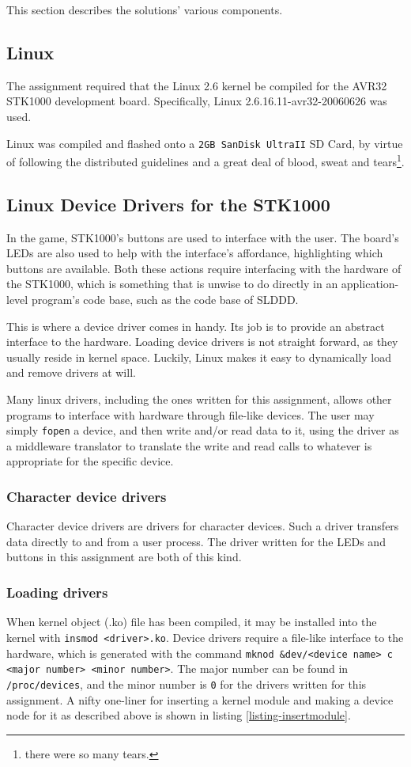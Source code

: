 This section describes the solutions' various components.

\subsection{Linux}
The assignment required that the Linux 2.6 kernel be compiled for the AVR32 STK1000 development board.
Specifically, Linux 2.6.16.11-avr32-20060626 was used.

Linux was compiled and flashed onto a \texttt{2GB SanDisk UltraII} SD Card, by virtue of following the distributed guidelines and a great deal of blood, sweat and tears\footnote{there were so many tears.}.

\subsection{Linux Device Drivers for the STK1000}
In the game, STK1000's buttons are used to interface with the user.
The board's LEDs are also used to help with the interface's affordance, highlighting which buttons are available.
Both these actions require interfacing with the hardware of the STK1000, which is something that is unwise to do directly in an application-level program's code base, such as the code base of SLDDD.

This is where a device driver comes in handy. Its job is to provide an abstract interface to the hardware.
Loading device drivers is not straight forward, as they usually reside in kernel space.
Luckily, Linux makes it easy to dynamically load and remove drivers at will.

Many linux drivers, including the ones written for this assignment, allows other programs to interface with hardware through file-like devices.
The user may simply \texttt{fopen} a device, and then write and/or read data to it, using the driver as a middleware translator to translate the write and read calls to whatever is appropriate for the specific device.
\subsubsection{Character device drivers}
    Character device drivers are drivers for character devices.
    Such a driver transfers data directly to and from a user process.
    The driver written for the LEDs and buttons in this assignment are both of this kind.
\subsubsection{Loading drivers}
When kernel object (.ko) file has been compiled, it may be installed into the kernel with \texttt{insmod <driver>.ko}.
Device drivers require a file-like interface to the hardware, which is generated with the command \texttt{mknod \&dev/<device name> c <major number> <minor number>}.
The major number can be found in \texttt{/proc/devices}, and the minor number is \texttt{0} for the drivers written for this assignment.
A nifty one-liner for inserting a kernel module and making a device node for it as described above is shown in listing \ref{listing-insertmodule}.

